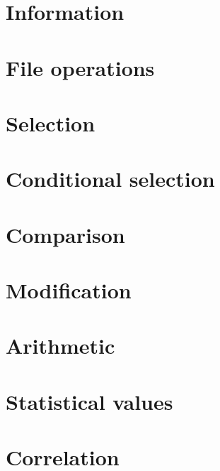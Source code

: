 \newpage
\section{Information}




\newpage
\section{File operations}




\newpage
\section{Selection}




\newpage
\section{Conditional selection}




\newpage
\section{Comparison}




\newpage
\section{Modification}




\newpage
\section{Arithmetic}




\newpage
\section{Statistical values}




\newpage
\section{Correlation}




